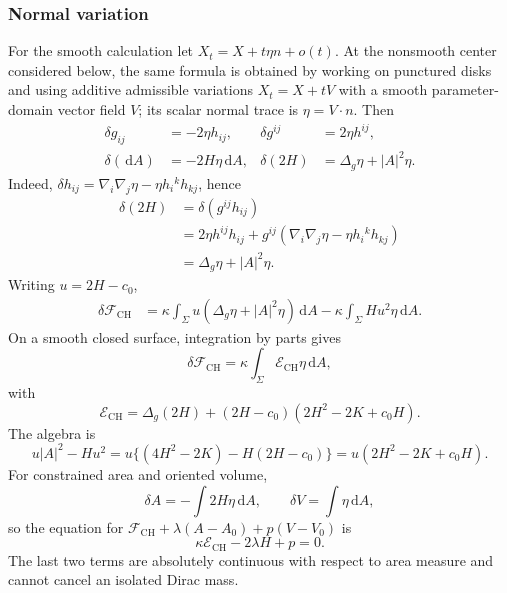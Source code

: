 \documentclass[preprint,amsmath,amssymb,aps,prl,superscriptaddress,nofootinbib,floatfix]{revtex4-2}
\newcommand{\dd}{\,\mathrm d}
\newcommand{\E}{\mathcal E}
\newcommand{\CH}{\mathrm{CH}}
\begin{document}
\subsubsection{Normal variation}
For the smooth calculation let \(X_t=X+t\eta n+o(t)\). At the nonsmooth center considered below, the same formula is obtained by working on punctured disks and using additive admissible variations \(X_t=X+tV\) with a smooth parameter-domain vector field \(V\); its scalar normal trace is \(\eta=V\cdot n\). Then
\begin{align}
\delta g_{ij}&=-2\eta h_{ij},&\delta g^{ij}&=2\eta h^{ij},\label{eq:metricvar}\\
\delta(\dd A)&=-2H\eta\dd A,&\delta(2H)&=\Delta_g\eta+|A|^2\eta.\label{eq:Hvar}
\end{align}
Indeed, \(\delta h_{ij}=\nabla_i\nabla_j\eta-\eta h_i{}^kh_{kj}\), hence
\begin{align*}
\delta(2H)&=\delta(g^{ij}h_{ij})\\
&=2\eta h^{ij}h_{ij}+g^{ij}(\nabla_i\nabla_j\eta-\eta h_i{}^kh_{kj})\\
&=\Delta_g\eta+|A|^2\eta.
\end{align*}
Writing \(u=2H-c_0\),
\begin{align}
\delta\mathcal F_{\CH}
&=\kappa\int_\Sigma u(\Delta_g\eta+|A|^2\eta)\dd A-\kappa\int_\Sigma Hu^2\eta\dd A.\label{eq:firstvar0}
\end{align}
On a smooth closed surface, integration by parts gives
\begin{equation}
\delta\mathcal F_{\CH}=\kappa\int_\Sigma\E_{\CH}\eta\dd A,\label{eq:firstvar}
\end{equation}
with
\begin{equation}
\E_{\CH}=\Delta_g(2H)+(2H-c_0)(2H^2-2K+c_0H).\label{eq:shapeoperator}
\end{equation}
The algebra is
\[
u|A|^2-Hu^2=u\{(4H^2-2K)-H(2H-c_0)\}=u(2H^2-2K+c_0H).
\]
For constrained area and oriented volume,
\[
\delta A=-\int2H\eta\dd A,\qquad\delta V=\int\eta\dd A,
\]
so the equation for \(\mathcal F_{\CH}+\lambda(A-A_0)+p(V-V_0)\) is
\begin{equation}
\kappa\E_{\CH}-2\lambda H+p=0.\label{eq:constrained}
\end{equation}
The last two terms are absolutely continuous with respect to area measure and cannot cancel an isolated Dirac mass.
\end{document}
